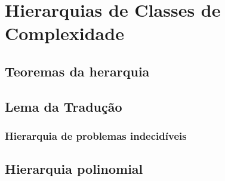\chapter{Hierarquias de Classes de Complexidade}




\section{Teoremas da herarquia}

\section{Lema da Tradução}
\label{secao_lema_traducao}



\subsection{Hierarquia de problemas indecidíveis}

\section{Hierarquia polinomial}
